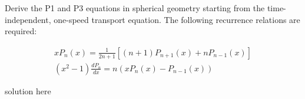 \documentclass[11pt,answers]{exam}
\begin{document}
\begin{questions}
        \question[20] Derive the P1 and P3 equations in spherical geometry starting from the time-independent, one-speed transport equation. The following recurrence relations are required:

        \begin{align}
                xP_n(x) = \frac{1}{2n+1}\left[(n+1)P_{n+1}(x) + n 
                P_{n-1}(x)\right]\\
                (x^2 -1) \frac{dP_n}{dx} = n (xP_n(x)  - P_{n-1}(x))
        \end{align}
        \begin{solution}
                solution here
        \end{solution}
\end{questions}



%
%
\end{document}
